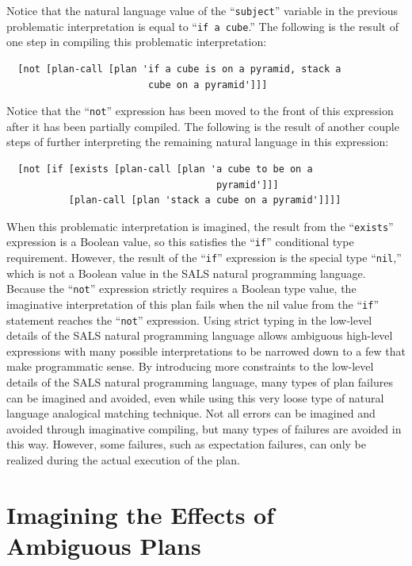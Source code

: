 Notice that the natural language value of the ``{\tt{subject}}''
variable in the previous problematic interpretation is equal to
``{\tt{if a cube}}.''  The following is the result of one step in
compiling this problematic interpretation:
\begin{Verbatim}
  [not [plan-call [plan 'if a cube is on a pyramid, stack a
                         cube on a pyramid']]]
\end{Verbatim}
Notice that the ``{\tt{not}}'' expression has been moved to the front
of this expression after it has been partially compiled.  The
following is the result of another couple steps of further
interpreting the remaining natural language in this expression:
\begin{Verbatim}
  [not [if [exists [plan-call [plan 'a cube to be on a
                                     pyramid']]]
           [plan-call [plan 'stack a cube on a pyramid']]]]
\end{Verbatim}
When this problematic interpretation is imagined, the result from the
``{\tt{exists}}'' expression is a Boolean value, so this satisfies the
``{\tt{if}}'' conditional type requirement.  However, the result of
the ``{\tt{if}}'' expression is the special type ``{\tt{nil}},'' which
is not a Boolean value in the SALS natural programming language.
Because the ``{\tt{not}}'' expression strictly requires a Boolean type
value, the imaginative interpretation of this plan fails when the nil
value from the ``{\tt{if}}'' statement reaches the ``{\tt{not}}''
expression.  Using strict typing in the low-level details of the SALS
natural programming language allows ambiguous high-level expressions
with many possible interpretations to be narrowed down to a few that
make programmatic sense.  By introducing more constraints to the
low-level details of the SALS natural programming language, many types
of plan failures can be imagined and avoided, even while using this
very loose type of natural language analogical matching technique.
Not all errors can be imagined and avoided through imaginative
compiling, but many types of failures are avoided in this way.
However, some failures, such as expectation failures, can only be
realized during the actual execution of the plan.

\section{Imagining the Effects of Ambiguous Plans}
\label{section:imagining_the_effects_of_ambiguous_plans}

